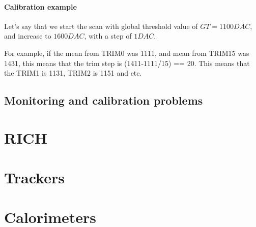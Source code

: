 \paragraph{Calibration example}
Let's say that we start the scan with global threshold value of $GT = 1100 DAC$, and increase to $1600 DAC$, with a
step of $1 DAC$.

For example, if the mean
from TRIM0 was 1111, and mean from TRIM15 was 1431, this means that the trim
step is (1411-1111/15) == 20. This means that the TRIM1 is 1131, TRIM2 is 1151 and etc.
\subsection{Monitoring and calibration problems}



\section{RICH}
\section{Trackers}
\section{Calorimeters}